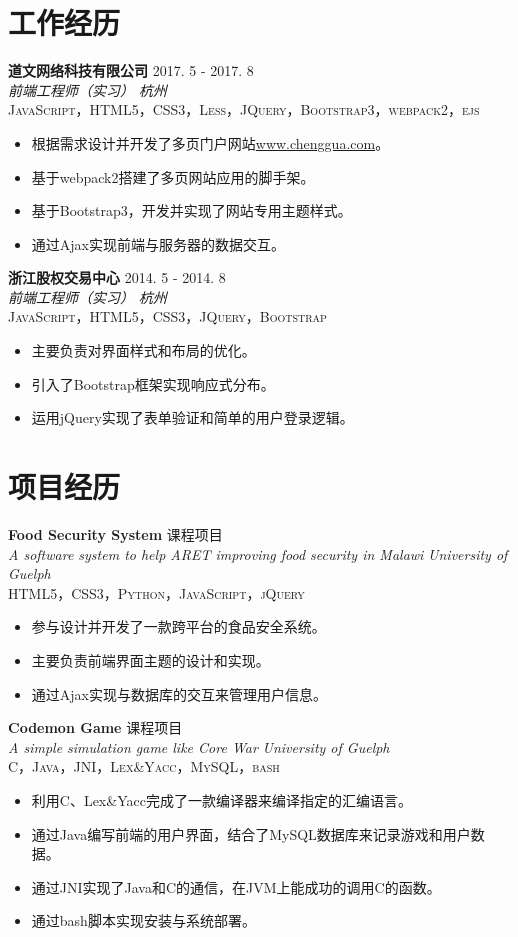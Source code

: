 \documentclass[10pt, letterpaper]{article}
\newcommand{\project}[6]{
	\noindent
    \textbf{\color{darktext}#1} \hfill {#2} \\
    \textit{\color{hardtext}#3} \hfill \textit{\color{awesome-emerald}#4}\\
    \textsc{#5}
    {#6}
    \vspace{10pt}
}
\begin{document}

\section*{工作经历}

\project{道文网络科技有限公司}{2017. 5 - 2017. 8}
{前端工程师（实习）}{杭州}
{JavaScript，HTML5，CSS3，Less，JQuery，Bootstrap3，webpack2，ejs}
{\begin{itemize}[leftmargin=*]
  	\item 根据需求设计并开发了多页门户网站\href{www.chenggua.com}{www.chenggua.com}。
  	\item 基于webpack2搭建了多页网站应用的脚手架。
    \item 基于Bootstrap3，开发并实现了网站专用主题样式。
    \item 通过Ajax实现前端与服务器的数据交互。
\end{itemize}}

\project{浙江股权交易中心}{2014. 5 - 2014. 8}
{前端工程师（实习）}{杭州}
{JavaScript，HTML5，CSS3，JQuery，Bootstrap}
{\begin{itemize}[leftmargin=*]
    \item 主要负责对界面样式和布局的优化。
    \item 引入了Bootstrap框架实现响应式分布。
    \item 运用jQuery实现了表单验证和简单的用户登录逻辑。
\end{itemize}}

\section*{项目经历}

\project{Food Security System}{课程项目}
{A software system to help ARET improving food security in Malawi}{University of Guelph}
{HTML5，CSS3，Python，JavaScript，jQuery}
{\begin{itemize}[leftmargin=*]
    \item 参与设计并开发了一款跨平台的食品安全系统。
    \item 主要负责前端界面主题的设计和实现。
    \item 通过Ajax实现与数据库的交互来管理用户信息。
\end{itemize}}

\project{Codemon Game}{课程项目}
{A simple simulation game like Core War}{University of Guelph}
{C，Java，JNI，Lex\&Yacc，MySQL，bash}
{\begin{itemize}[leftmargin=*]
    \item 利用C、Lex\&Yacc完成了一款编译器来编译指定的汇编语言。
    \item 通过Java编写前端的用户界面，结合了MySQL数据库来记录游戏和用户数据。
    \item 通过JNI实现了Java和C的通信，在JVM上能成功的调用C的函数。
    \item 通过bash脚本实现安装与系统部署。
\end{itemize}}
\end{document}
